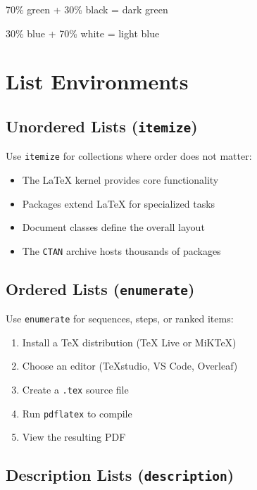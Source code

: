 \documentclass[12pt,a4paper]{article}
\begin{document}
\textcolor{green!70!black}{70\% green + 30\% black = dark green}

\textcolor{blue!30}{30\% blue + 70\% white = light blue}


\section{List Environments}
\label{sec:lists}

\subsection{Unordered Lists (\texttt{itemize})}

Use \texttt{itemize} for collections where order does not matter:

\begin{itemize}
    \item The \LaTeX{} kernel provides core functionality
    \item Packages extend \LaTeX{} for specialized tasks
    \item Document classes define the overall layout
    \item The \texttt{CTAN} archive hosts thousands of packages
\end{itemize}

\subsection{Ordered Lists (\texttt{enumerate})}

Use \texttt{enumerate} for sequences, steps, or ranked items:

\begin{enumerate}
    \item Install a \TeX{} distribution (TeX Live or MiKTeX)
    \item Choose an editor (TeXstudio, VS Code, Overleaf)
    \item Create a \texttt{.tex} source file
    \item Run \texttt{pdflatex} to compile
    \item View the resulting PDF
\end{enumerate}

\subsection{Description Lists (\texttt{description})}
\end{document}
